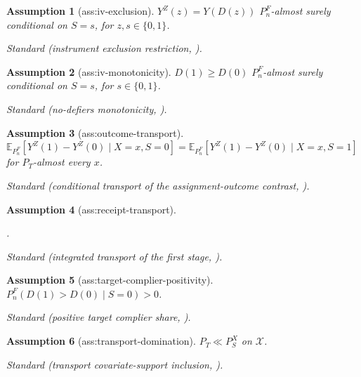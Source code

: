 \documentclass{article}
\newtheorem{assumption}{Assumption}
\begin{document}
\begin{assumption}[ass:iv-exclusion]\label{ass:iv-exclusion}
\(Y^Z(z)=Y(D(z))\) \(P_n^F\)-almost surely conditional on \(S=s\), for \(z,s\in\{0,1\}\).
\par\smallskip\noindent\emph{Standard} (instrument exclusion restriction, \cite{ChenHuang2025}).
\end{assumption}

\begin{assumption}[ass:iv-monotonicity]\label{ass:iv-monotonicity}
\(D(1)\ge D(0)\) \(P_n^F\)-almost surely conditional on \(S=s\), for \(s\in\{0,1\}\).
\par\smallskip\noindent\emph{Standard} (no-defiers monotonicity, \cite{ChenHuang2025}).
\end{assumption}

\begin{assumption}[ass:outcome-transport]\label{ass:outcome-transport}
\(\mathbb E_{P_n^F}[Y^Z(1)-Y^Z(0)\mid X=x,S=0]=\mathbb E_{P_n^F}[Y^Z(1)-Y^Z(0)\mid X=x,S=1]\) for \(P_T\)-almost every \(x\).
\par\smallskip\noindent\emph{Standard} (conditional transport of the assignment-outcome contrast, \cite{ChenHuang2025}).
\end{assumption}

\begin{assumption}[ass:receipt-transport]\label{ass:receipt-transport}
\par\noindent {}\par\noindent.
\par\smallskip\noindent\emph{Standard} (integrated transport of the first stage, \cite{ChenHuang2025}).
\end{assumption}

\begin{assumption}[ass:target-complier-positivity]\label{ass:target-complier-positivity}
\(P_n^F(D(1)>D(0)\mid S=0)>0\).
\par\smallskip\noindent\emph{Standard} (positive target complier share, \cite{ChenHuang2025}).
\end{assumption}

\begin{assumption}[ass:transport-domination]\label{ass:transport-domination}
\(P_T\ll P_S^X\) on \(\mathcal X\).
\par\smallskip\noindent\emph{Standard} (transport covariate-support inclusion, \cite{ChenHuang2025}).
\end{assumption}
\end{document}
